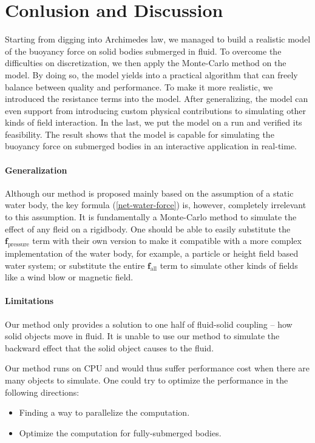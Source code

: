 \section{Conlusion and Discussion}

Starting from digging into Archimedes law, we managed to build a realistic model of the buoyancy force on solid bodies submerged in fluid.
To overcome the difficulties on discretization, we then apply the Monte-Carlo method on the model.
By doing so, the model yields into a practical algorithm that can freely balance between quality and performance.
To make it more realistic, we introduced the resistance terms into the model.
After generalizing, the model can even support from introducing custom physical contributions to simulating other kinds of field interaction.
In the last, we put the model on a run and verified its feasibility.
The result shows that the model is capable for simulating the buoyancy force on submerged bodies in an interactive application in real-time.

\paragraph*{Generalization}

Although our method is proposed mainly based on the assumption of a static water body,
the key formula (\ref{net-water-force}) is, however, completely irrelevant to this assumption.
It is fundamentally a Monte-Carlo method to simulate the effect of any fleid on a rigidbody.
One should be able to easily substitute the $\mathbf{f}_{\text{pressure}}$ term with their own version to make it compatible with a more complex implementation of the water body, for example, a particle or height field based water system; or substitute the entire $\mathbf{f}_{\text{all}}$ term to simulate other kinds of fields like a wind blow or magnetic field.

\paragraph*{Limitations}

Our method only provides a solution to one half of fluid-solid coupling -- how solid objects move in fluid.
It is unable to use our method to simulate the backward effect that the solid object causes to the fluid.

Our method runs on CPU and would thus suffer performance cost when there are many objects to simulate.
One could try to optimize the performance in the following directions:
\begin{itemize}
	\item Finding a way to parallelize the computation.
	\item Optimize the computation for fully-submerged bodies.
\end{itemize}

